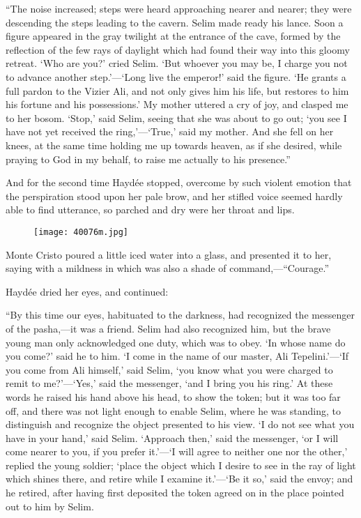 “The noise increased; steps were heard approaching nearer and nearer;
they were descending the steps leading to the cavern. Selim made ready
his lance. Soon a figure appeared in the gray twilight at the entrance
of the cave, formed by the reflection of the few rays of daylight which
had found their way into this gloomy retreat. ‘Who are you?’ cried
Selim. ‘But whoever you may be, I charge you not to advance another
step.’—‘Long live the emperor!’ said the figure. ‘He grants a full
pardon to the Vizier Ali, and not only gives him his life, but restores
to him his fortune and his possessions.’ My mother uttered a cry of
joy, and clasped me to her bosom. ‘Stop,’ said Selim, seeing that she
was about to go out; ‘you see I have not yet received the
ring,’—‘True,’ said my mother. And she fell on her knees, at the same
time holding me up towards heaven, as if she desired, while praying to
God in my behalf, to raise me actually to his presence.”

And for the second time Haydée stopped, overcome by such violent
emotion that the perspiration stood upon her pale brow, and her stifled
voice seemed hardly able to find utterance, so parched and dry were her
throat and lips.

\begin{figure}[ht]
\texttt{[image: 40076m.jpg]}
\end{figure}

Monte Cristo poured a little iced water into a glass, and presented it
to her, saying with a mildness in which was also a shade of
command,—“Courage.”

Haydée dried her eyes, and continued:

“By this time our eyes, habituated to the darkness, had recognized the
messenger of the pasha,—it was a friend. Selim had also recognized him,
but the brave young man only acknowledged one duty, which was to obey.
‘In whose name do you come?’ said he to him. ‘I come in the name of our
master, Ali Tepelini.’—‘If you come from Ali himself,’ said Selim, ‘you
know what you were charged to remit to me?’—‘Yes,’ said the messenger,
‘and I bring you his ring.’ At these words he raised his hand above his
head, to show the token; but it was too far off, and there was not
light enough to enable Selim, where he was standing, to distinguish and
recognize the object presented to his view. ‘I do not see what you have
in your hand,’ said Selim. ‘Approach then,’ said the messenger, ‘or I
will come nearer to you, if you prefer it.’—‘I will agree to neither
one nor the other,’ replied the young soldier; ‘place the object which
I desire to see in the ray of light which shines there, and retire
while I examine it.’—‘Be it so,’ said the envoy; and he retired, after
having first deposited the token agreed on in the place pointed out to
him by Selim.

